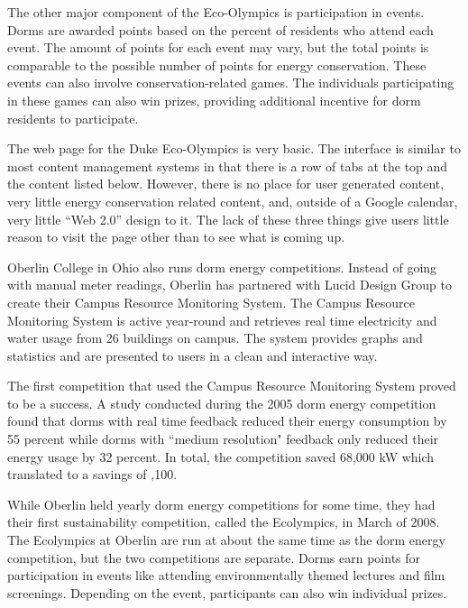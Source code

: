 The other major component of the Eco-Olympics is participation in events.  Dorms are awarded points based on the percent of residents who attend each event.  The amount of points for each event may vary, but the total points is comparable to the possible number of points for energy conservation.  These events can also involve conservation-related games.  The individuals participating in these games can also win prizes, providing additional incentive for dorm residents to participate.

The web page for the Duke Eco-Olympics is very basic.  The interface is similar to most content management systems in that there is a row of tabs at the top and the content listed below.  However, there is no place for user generated content, very little energy conservation related content, and, outside of a Google calendar, very little ``Web 2.0'' design to it.  The lack of these three things give users little reason to visit the page other than to see what is coming up.

Oberlin College in Ohio also runs dorm energy competitions.  Instead of going with manual meter readings, Oberlin has partnered with Lucid Design Group to create their Campus Resource Monitoring System\cite{oberlin-comp}.  The Campus Resource Monitoring System is active year-round and retrieves real time electricity and water usage from 26 buildings\cite{lucid-oberlin} on campus.  The system provides graphs and statistics and are presented to users in a clean and interactive way.

The first competition that used the Campus Resource Monitoring System proved to be a success.  A study conducted during the 2005 dorm energy competition found that dorms with real time feedback reduced their energy consumption by 55 percent while dorms with ``medium resolution" feedback only reduced their energy usage by 32 percent\cite{oberlin-goals}.  In total, the competition saved 68,000 kW which translated to a savings of ,100.

While Oberlin held yearly dorm energy competitions for some time, they had their first sustainability competition, called the Ecolympics, in March of 2008\cite{oberlin-history}.  The Ecolympics at Oberlin are run at about the same time as the dorm energy competition, but the two competitions are separate.  Dorms earn points for participation in events like attending environmentally themed lectures and film screenings\cite{oberlin-news}.  Depending on the event, participants can also win individual prizes.

